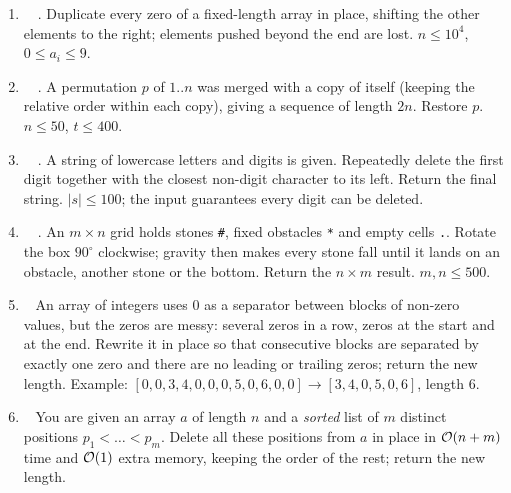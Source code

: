 \exlegend
\begin{enumerate}[leftmargin=*, label=\textbf{E2.\arabic*}, itemsep=6pt]
    \item \exeasy\ \ptricky {}\ . Duplicate every zero of a fixed-length array in place, shifting the other elements to the right; elements pushed beyond the end are lost. $n \le 10^4$, $0 \le a_i \le 9$.
    \item \exeasy\ \pclassic {}\ . A permutation $p$ of $1..n$ was merged with a copy of itself (keeping the relative order within each copy), giving a sequence of length $2n$. Restore $p$. $n \le 50$, $t \le 400$.
    \item \exeasy\ \precent {}\ . A string of lowercase letters and digits is given. Repeatedly delete the first digit together with the closest non-digit character to its left. Return the final string. $|s| \le 100$; the input guarantees every digit can be deleted.
    \item \exmedium\ \pconcept {}\ . An $m \times n$ grid holds stones \texttt{\#}, fixed obstacles \texttt{*} and empty cells \texttt{.}. Rotate the box $90^\circ$ clockwise; gravity then makes every stone fall until it lands on an obstacle, another stone or the bottom. Return the $n \times m$ result. $m, n \le 500$.
    \item \exmedium\ \ptricky {} An array of integers uses $0$ as a separator between blocks of non-zero values, but the zeros are messy: several zeros in a row, zeros at the start and at the end. Rewrite it in place so that consecutive blocks are separated by exactly one zero and there are no leading or trailing zeros; return the new length. Example: $[0,0,3,4,0,0,0,5,0,6,0,0] \to [3,4,0,5,0,6]$, length 6.
    \item \exmedium\ \pconcept {} You are given an array $a$ of length $n$ and a \emph{sorted} list of $m$ distinct positions $p_1 < \dots < p_m$. Delete all these positions from $a$ in place in $\mathcal{O}(n + m)$ time and $\mathcal{O}(1)$ extra memory, keeping the order of the rest; return the new length.
\end{enumerate}

